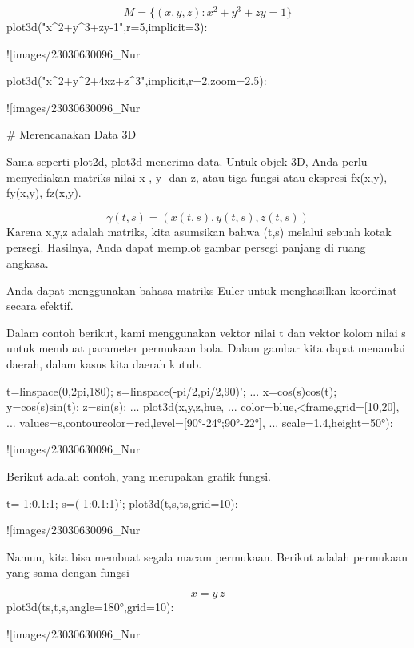 \documentclass{article}
\begin{document}
$$M = \{ (x,y,z) : x^2+y^3+zy=1 \}$$\>plot3d("x^2+y^3+z\*y-1",r=5,implicit=3):


![images/23030630096_Nur%

\>plot3d("x^2+y^2+4\*x\*z+z^3",\>implicit,r=2,zoom=2.5):


![images/23030630096_Nur%

# Merencanakan Data 3D

Sama seperti plot2d, plot3d menerima data. Untuk objek 3D, Anda perlu
menyediakan matriks nilai x-, y- dan z, atau tiga fungsi atau ekspresi
fx(x,y), fy(x,y), fz(x,y).


$$\gamma(t,s) = (x(t,s),y(t,s),z(t,s))$$Karena x,y,z adalah matriks, kita asumsikan bahwa (t,s) melalui sebuah
kotak persegi. Hasilnya, Anda dapat memplot gambar persegi panjang di
ruang angkasa.


Anda dapat menggunakan bahasa matriks Euler untuk menghasilkan
koordinat secara efektif.


Dalam contoh berikut, kami menggunakan vektor nilai t dan vektor kolom
nilai s untuk membuat parameter permukaan bola. Dalam gambar kita
dapat menandai daerah, dalam kasus kita daerah kutub.


\>t=linspace(0,2pi,180); s=linspace(-pi/2,pi/2,90)'; ...  
\>   x=cos(s)\*cos(t); y=cos(s)\*sin(t); z=sin(s); ...  
\>   plot3d(x,y,z,\>hue, ...  
\>   color=blue,<frame,grid=[10,20], ...  
\>   values=s,contourcolor=red,level=[90°-24°;90°-22°], ...  
\>   scale=1.4,height=50°):


![images/23030630096_Nur%

Berikut adalah contoh, yang merupakan grafik fungsi.


\>t=-1:0.1:1; s=(-1:0.1:1)'; plot3d(t,s,t\*s,grid=10):


![images/23030630096_Nur%

Namun, kita bisa membuat segala macam permukaan. Berikut adalah
permukaan yang sama dengan fungsi


$$x = y \, z$$\>plot3d(t\*s,t,s,angle=180°,grid=10):


![images/23030630096_Nur%
\end{document}
